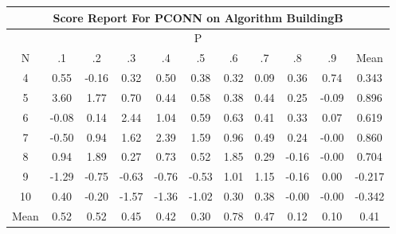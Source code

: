 \documentclass[11pt,a4paper]{report}
\begin{document}
\begin{longtable}{ | c || c | c | c | c | c | c | c | c | c || c |}
\hline
\multicolumn{11}{|c|}{ Score Report For PCONN on Algorithm BuildingB} \\
\hline
\multicolumn{11}{|c|}{ P } \\
\hline
N & .1 & .2 & .3 & .4 & .5 & .6 & .7 & .8 & .9 & Mean\\
 \hline
 \hline
 \endhead
  4 &  \cellcolor[HTML]{EFEFFF} 0.55 &  \cellcolor[HTML]{FFF7F7} -0.16 &  \cellcolor[HTML]{F7F7FF} 0.32 &  \cellcolor[HTML]{EFEFFF} 0.50 &  \cellcolor[HTML]{F7F7FF} 0.38 &  \cellcolor[HTML]{F7F7FF} 0.32 &  \cellcolor[HTML]{FFFFFF} 0.09 &  \cellcolor[HTML]{F7F7FF} 0.36 &  \cellcolor[HTML]{EFEFFF} 0.74 & 0.343 \\
  5 &  \cellcolor[HTML]{A7A7FF} 3.60 &  \cellcolor[HTML]{CFCFFF} 1.77 &  \cellcolor[HTML]{EFEFFF} 0.70 &  \cellcolor[HTML]{F7F7FF} 0.44 &  \cellcolor[HTML]{EFEFFF} 0.58 &  \cellcolor[HTML]{F7F7FF} 0.38 &  \cellcolor[HTML]{F7F7FF} 0.44 &  \cellcolor[HTML]{F7F7FF} 0.25 &  \cellcolor[HTML]{FFFFFF} -0.09 & 0.896 \\
  6 &  \cellcolor[HTML]{FFFFFF} -0.08 &  \cellcolor[HTML]{FFFFFF} 0.14 &  \cellcolor[HTML]{BFBFFF} 2.44 &  \cellcolor[HTML]{E7E7FF} 1.04 &  \cellcolor[HTML]{EFEFFF} 0.59 &  \cellcolor[HTML]{EFEFFF} 0.63 &  \cellcolor[HTML]{F7F7FF} 0.41 &  \cellcolor[HTML]{F7F7FF} 0.33 &  \cellcolor[HTML]{FFFFFF} 0.07 & 0.619 \\
  7 &  \cellcolor[HTML]{FFEFEF} -0.50 &  \cellcolor[HTML]{E7E7FF} 0.94 &  \cellcolor[HTML]{D7D7FF} 1.62 &  \cellcolor[HTML]{BFBFFF} 2.39 &  \cellcolor[HTML]{D7D7FF} 1.59 &  \cellcolor[HTML]{E7E7FF} 0.96 &  \cellcolor[HTML]{EFEFFF} 0.49 &  \cellcolor[HTML]{F7F7FF} 0.24 &  \cellcolor[HTML]{FFFFFF} -0.00 & 0.860 \\
  8 &  \cellcolor[HTML]{E7E7FF} 0.94 &  \cellcolor[HTML]{CFCFFF} 1.89 &  \cellcolor[HTML]{F7F7FF} 0.27 &  \cellcolor[HTML]{EFEFFF} 0.73 &  \cellcolor[HTML]{EFEFFF} 0.52 &  \cellcolor[HTML]{CFCFFF} 1.85 &  \cellcolor[HTML]{F7F7FF} 0.29 &  \cellcolor[HTML]{FFF7F7} -0.16 &  \cellcolor[HTML]{FFFFFF} -0.00 & 0.704 \\
  9 &  \cellcolor[HTML]{FFDFDF} -1.29 &  \cellcolor[HTML]{FFEFEF} -0.75 &  \cellcolor[HTML]{FFEFEF} -0.63 &  \cellcolor[HTML]{FFEFEF} -0.76 &  \cellcolor[HTML]{FFEFEF} -0.53 &  \cellcolor[HTML]{E7E7FF} 1.01 &  \cellcolor[HTML]{DFDFFF} 1.15 &  \cellcolor[HTML]{FFFFFF} -0.16 &  \cellcolor[HTML]{FFFFFF} 0.00 & -0.217 \\
  10 &  \cellcolor[HTML]{F7F7FF} 0.40 &  \cellcolor[HTML]{FFF7F7} -0.20 &  \cellcolor[HTML]{FFD7D7} -1.57 &  \cellcolor[HTML]{FFDFDF} -1.36 &  \cellcolor[HTML]{FFE7E7} -1.02 &  \cellcolor[HTML]{F7F7FF} 0.30 &  \cellcolor[HTML]{F7F7FF} 0.38 &  \cellcolor[HTML]{FFFFFF} -0.00 &  \cellcolor[HTML]{FFFFFF} -0.00 & -0.342 \\
 \hline
 \hline
Mean &  \cellcolor[HTML]{EFEFFF} 0.52 &  \cellcolor[HTML]{EFEFFF} 0.52 &  \cellcolor[HTML]{F7F7FF} 0.45 &  \cellcolor[HTML]{F7F7FF} 0.42 &  \cellcolor[HTML]{F7F7FF} 0.30 &  \cellcolor[HTML]{EFEFFF} 0.78 &  \cellcolor[HTML]{F7F7FF} 0.47 &  \cellcolor[HTML]{FFFFFF} 0.12 &  \cellcolor[HTML]{FFFFFF} 0.10 &  \cellcolor[HTML]{F7F7FF} 0.41
\end{longtable}
\end{document}
